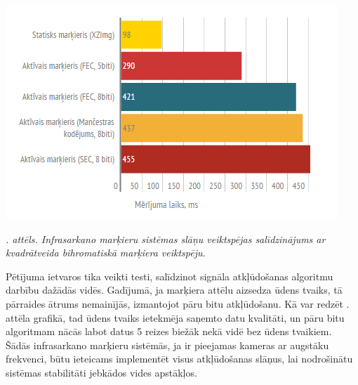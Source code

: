 \documentclass[12pt, a4paper, oneside, openright]{article}
\renewcommand{\thecimages}{\arabic{cimages}}
\begin{document}
\label{cimages:merijumi_comparison.png}
\vspace{10pt}
\begin{samepage}
\begin{center}
\includegraphics[width=0.8\columnwidth]{images/merijumi_comparison.png}
\begin{center}
\footnotesize{
\textit{\thecimages. attēls. Infrasarkano marķieru sistēmas slāņu veiktspējas salīdzinājums ar kvadrātveida bihromatiskā marķiera veiktspēju.}}
\end{center}
\end{center}
\end{samepage}

\newpage
\par 
Pētījuma ietvaros tika veikti testi, salīdzinot signāla atkļūdošanas algoritmu darbību dažādās
vidēs. Gadījumā, ja marķiera attēlu aizsedza ūdens tvaiks, tā pārraides ātrums nemainījās, izmantojot
pāru bitu atkļūdošanu. Kā var redzēt . attēla grafikā,
tad ūdens tvaiks ietekmēja saņemto datu kvalitāti, un pāru bitu algoritmam nācās labot datus 5 reizes biežāk nekā
vidē bez ūdens tvaikiem. Šādās infrasarkano marķieru sistēmās, ja ir pieejamas kameras ar augstāku frekvenci, būtu ieteicams
implementēt visus atkļūdošanas slāņus, lai nodrošinātu sistēmas stabilitāti jebkādos vides apstākļos.
\end{document}
